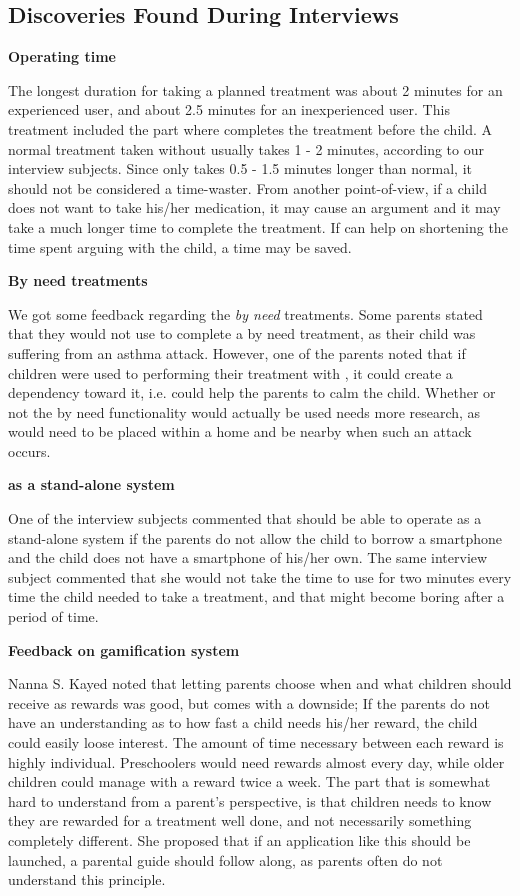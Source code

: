 \subsection{Discoveries Found During Interviews}

\textbf{Operating time}

The longest duration for taking a planned treatment was about 2 minutes for an experienced user, and about 2.5 minutes for an inexperienced user. This treatment included the part where \buddy{} completes the treatment before the child. A normal treatment taken without \ab{} usually takes 1 - 2 minutes, according to our interview subjects. Since \ab{} only takes 0.5 - 1.5 minutes longer than normal, it should not be considered a time-waster. From another point-of-view, if a child does not want to take his/her medication, it may cause an argument and it may take a much longer time to complete the treatment. If \ab{} can help on shortening the time spent arguing with the child, a time may be saved.      

\clearpage{}
\textbf{By need treatments}

We got some feedback regarding the \emph{by need} treatments. Some parents stated that they would not use \buddy{} to complete a by need treatment, as their child was suffering from an asthma attack. However, one of the parents noted that if children were used to performing their treatment with \buddy{}, it could create a dependency toward it, i.e. \buddy{} could help the parents to calm the child. Whether or not the by need functionality would actually be used needs more research, as \buddy{} would need to be placed within a home and be nearby when such an attack occurs. 

\textbf{\ab{} as a stand-alone system}

One of the interview subjects commented that \ab{} should be able to operate as a stand-alone system if the parents do not allow the child to borrow a smartphone and the child does not have a smartphone of his/her own. The same interview subject commented that she would not take the time to use \ab{} for two minutes every time the child needed to take a treatment, and that \ab{} might become boring after a period of time.

\textbf{Feedback on gamification system}

Nanna S. Kayed noted that letting parents choose when and what children should receive as rewards was good, but comes with a downside; If the parents do not have an understanding as to how fast a child needs his/her reward, the child could easily loose interest. The amount of time necessary between each reward is highly individual. Preschoolers would need rewards almost every day, while older children could manage with a reward twice a week. The part that is somewhat hard to understand from a parent's perspective, is that children needs to know they are rewarded for a treatment well done, and not necessarily something completely different. She proposed that if an application like this should be launched, a parental guide should follow along, as parents often do not understand this principle.

